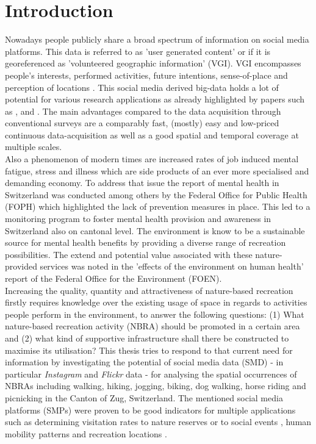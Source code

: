 \chapter{Introduction}
Nowadays people publicly share a broad spectrum of information on social media platforms. This data is referred to as 'user generated content' or if it is georeferenced as 'volunteered geographic information' (VGI). VGI encompasses people's interests, performed activities, future intentions, sense-of-place and perception of locations \parencite{Goodchild2007}. This social media derived big-data holds a lot of potential for various research applications as already highlighted by papers such as \parencite{DiMinin2015}, \parencite{DiMinin2017} and \parencite{Meentemeyer2016}. The main advantages compared to the data acquisition through conventional surveys are a comparably fast, (mostly) easy and low-priced continuous data-acquisition as well as a good spatial and temporal coverage at multiple scales. \\
Also a phenomenon of modern times are increased rates of job induced mental fatigue, stress and illness which are side products of an ever more specialised and demanding economy. To address that issue the report of mental health in Switzerland \parencite{Ruesch2003} was conducted among others by the Federal Office for Public Health (FOPH) which highlighted the lack of prevention measures in place. This led to a monitoring program to foster mental health provision and awareness in Switzerland \parencite{Schuler2012} also on cantonal level. The environment is know to be a sustainable source for mental health benefits by providing a diverse range of recreation possibilities. The extend and potential value associated with these nature-provided services was noted in the 'effects of the environment on human health' report \parencite{Ragettli2017} of the Federal Office for the Environment (FOEN).\\
\newline
Increasing the quality, quantity and attractiveness of nature-based recreation firstly requires knowledge over the existing usage of space in regards to activities people perform in the environment, to answer the following questions: (1) What nature-based recreation activity (NBRA) should be promoted in a certain area and (2) what kind of supportive infrastructure shall there be constructed to maximise its utilisation? This thesis tries to respond to that current need for information by investigating the potential of social media data (SMD) - in particular \textit{Instagram} and \textit{Flickr} data - for analysing the spatial occurrences of NBRAs including walking, hiking, jogging, biking, dog walking, horse riding and picnicking in the Canton of Zug, Switzerland. The mentioned social media platforms (SMPs) were proven to be good indicators for multiple applications such as determining visitation rates to nature reserves \parencite{Tenkanen2017, Heikinheimo2017, Keeler2015, Wood2013} or to social events \parencite{Pettersson2011}, human mobility patterns \parencite{Barchiesi2015, Grossenbacher2014} and recreation locations \parencite{Weyland2014, Hill2006, Neuvonen2010}.

